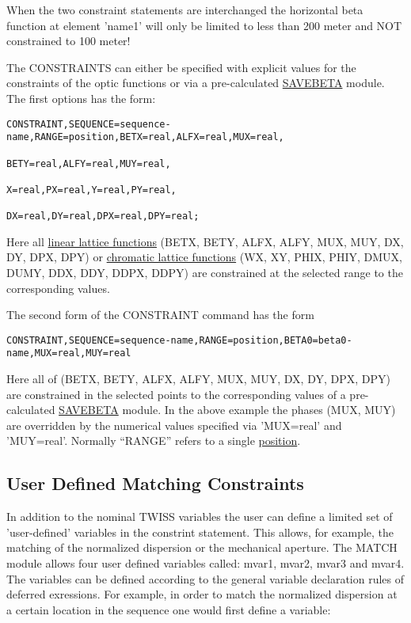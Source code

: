 When the two constraint statements are interchanged the horizontal beta function at element 'name1' will only be limited to less than 200 meter and NOT constrained to 100 meter!

The CONSTRAINTS can either be specified with explicit values for the constraints of the optic functions or via a pre-calculated \href{../control/general.html#savebeta}{SAVEBETA} module. The first options has the form:
\begin{verbatim}
CONSTRAINT,SEQUENCE=sequence-name,RANGE=position,BETX=real,ALFX=real,MUX=real,
                                                 BETY=real,ALFY=real,MUY=real,
                                                 X=real,PX=real,Y=real,PY=real,
                                                 DX=real,DY=real,DPX=real,DPY=real;

\end{verbatim}

Here all \href{../Introduction/tables.html#linear}{linear lattice functions} 
(BETX, BETY, ALFX, ALFY, MUX, MUY, DX, DY, DPX, DPY)
or \href{../Introduction/tables.html#chrom}{chromatic lattice functions}
(WX, XY, PHIX, PHIY, DMUX, DUMY, DDX, DDY, DDPX, DDPY)
are constrained at the selected range to the corresponding values.

The second form of the CONSTRAINT command has the form
\begin{verbatim}
CONSTRAINT,SEQUENCE=sequence-name,RANGE=position,BETA0=beta0-name,MUX=real,MUY=real
\end{verbatim}

Here all of (BETX, BETY, ALFX, ALFY, MUX, MUY, DX, DY, DPX, DPY)
are constrained in the selected points to the corresponding values
of a pre-calculated \href{../control/general.html#savebeta}{SAVEBETA} module.
In the above example
the phases (MUX, MUY) are overridden by the numerical values specified via
'MUX=real' and 'MUY=real'.
Normally ``RANGE'' refers to a single
\href{../Introduction/ranges.html#position}{position}.

\subsection{User Defined Matching Constraints}

In addition to the nominal TWISS variables the user can define a limited set of 'user-defined' variables in the constrint statement. This allows, for example, the matching of the normalized dispersion or the mechanical aperture. The MATCH module allows four user defined variables called: mvar1, mvar2, mvar3 and mvar4. The variables can be defined according to the general variable declaration rules of deferred exressions. For example, in order to match the normalized dispersion at a certain location in the sequence one would first define a variable: 

